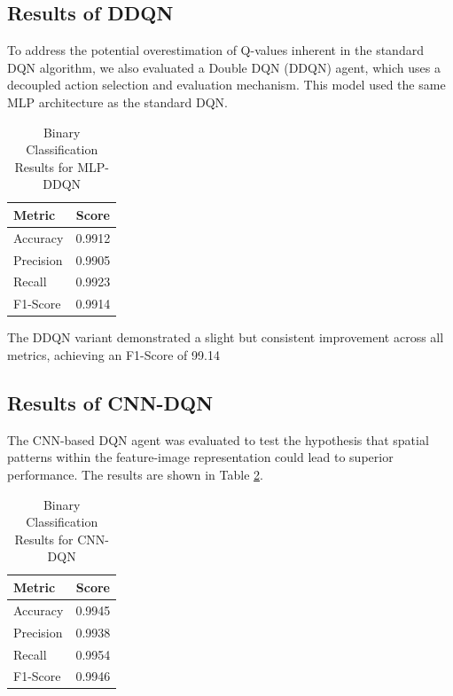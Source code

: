 \documentclass{report}
\begin{document}
\subsection{Results of DDQN}
To address the potential overestimation of Q-values inherent in the standard DQN algorithm, we also evaluated a Double DQN (DDQN) agent, which uses a decoupled action selection and evaluation mechanism. This model used the same MLP architecture as the standard DQN.

\begin{table}[H]
    \centering
    \caption{Binary Classification Results for MLP-DDQN}
    \label{tab:binary_ddqn_results}
    \begin{tabular}{@{}lc@{}}
        \toprule
        \textbf{Metric} & \textbf{Score} \\
        \midrule
        Accuracy & 0.9912 \\
        Precision & 0.9905 \\
        Recall & 0.9923 \\
        F1-Score & 0.9914 \\
        \bottomrule
    \end{tabular}
\end{table}

The DDQN variant demonstrated a slight but consistent improvement across all metrics, achieving an F1-Score of 99.14%

\subsection{Results of CNN-DQN}
The CNN-based DQN agent was evaluated to test the hypothesis that spatial patterns within the feature-image representation could lead to superior performance. The results are shown in Table \ref{tab:binary_cnn_dqn_results}.

\begin{table}[H]
    \centering
    \caption{Binary Classification Results for CNN-DQN}
    \label{tab:binary_cnn_dqn_results}
    \begin{tabular}{@{}lc@{}}
        \toprule
        \textbf{Metric} & \textbf{Score} \\
        \midrule
        Accuracy & 0.9945 \\
        Precision & 0.9938 \\
        Recall & 0.9954 \\
        F1-Score & 0.9946 \\
        \bottomrule
    \end{tabular}
\end{table}
\end{document}
